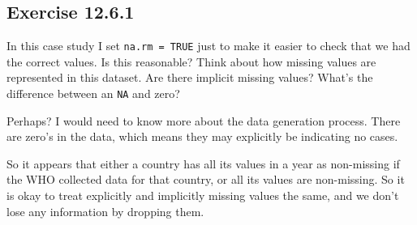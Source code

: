 \documentclass[]{book}
\newenvironment{Shaded}{\begin{snugshade}}{\end{snugshade}}
\newcommand{\CommentTok}[1]{\textcolor[rgb]{0.56,0.35,0.01}{\textit{#1}}}
\newcommand{\DataTypeTok}[1]{\textcolor[rgb]{0.13,0.29,0.53}{#1}}
\newcommand{\DecValTok}[1]{\textcolor[rgb]{0.00,0.00,0.81}{#1}}
\newcommand{\KeywordTok}[1]{\textcolor[rgb]{0.13,0.29,0.53}{\textbf{#1}}}
\newcommand{\NormalTok}[1]{#1}
\newcommand{\OperatorTok}[1]{\textcolor[rgb]{0.81,0.36,0.00}{\textbf{#1}}}
\newcommand{\StringTok}[1]{\textcolor[rgb]{0.31,0.60,0.02}{#1}}
\theoremstyle{plain}
\theoremstyle{remark}
\begin{document}
\hypertarget{exercise-12.6.1}{%
\subsection*{\texorpdfstring{Exercise
{12.6.1}}{Exercise 12.6.1}}\label{exercise-12.6.1}}

In this case study I set \texttt{na.rm\ =\ TRUE} just to make it easier
to check that we had the correct values. Is this reasonable? Think about
how missing values are represented in this dataset. Are there implicit
missing values? What's the difference between an \texttt{NA} and zero?

Perhaps? I would need to know more about the data generation process.
There are zero's in the data, which means they may explicitly be
indicating no cases.

\begin{Shaded}
\end{Shaded}

So it appears that either a country has all its values in a year as
non-missing if the WHO collected data for that country, or all its
values are non-missing. So it is okay to treat explicitly and implicitly
missing values the same, and we don't lose any information by dropping
them.

\begin{Shaded}
\end{Shaded}
\end{document}
